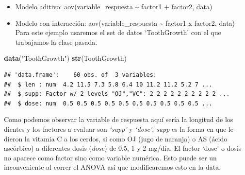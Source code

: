 \documentclass[
]{book}
\newenvironment{Shaded}{\begin{snugshade}}{\end{snugshade}}
\newcommand{\AttributeTok}[1]{\textcolor[rgb]{0.13,0.29,0.53}{#1}}
\newcommand{\DecValTok}[1]{\textcolor[rgb]{0.00,0.00,0.81}{#1}}
\newcommand{\FloatTok}[1]{\textcolor[rgb]{0.00,0.00,0.81}{#1}}
\newcommand{\FunctionTok}[1]{\textcolor[rgb]{0.13,0.29,0.53}{\textbf{#1}}}
\newcommand{\NormalTok}[1]{#1}
\newcommand{\OtherTok}[1]{\textcolor[rgb]{0.56,0.35,0.01}{#1}}
\newcommand{\SpecialCharTok}[1]{\textcolor[rgb]{0.81,0.36,0.00}{\textbf{#1}}}
\newcommand{\StringTok}[1]{\textcolor[rgb]{0.31,0.60,0.02}{#1}}
\begin{document}
\begin{itemize}
\item
  Modelo aditivo: aov(variable\_respuesta \textasciitilde{} factor1 + factor2, data)
\item
  Modelo con interacción: aov(variable\_respuesta \textasciitilde{} factor1 x factor2, data)\\
  Para este ejemplo usaremos el set de datos `ToothGrowth' con el que trabajamos la clase pasada.\\
\end{itemize}

\begin{Shaded}
\begin{Highlighting}[]
\FunctionTok{data}\NormalTok{(}\StringTok{"ToothGrowth"}\NormalTok{)}
\FunctionTok{str}\NormalTok{(ToothGrowth)}
\end{Highlighting}
\end{Shaded}

\begin{verbatim}
## 'data.frame':    60 obs. of  3 variables:
##  $ len : num  4.2 11.5 7.3 5.8 6.4 10 11.2 11.2 5.2 7 ...
##  $ supp: Factor w/ 2 levels "OJ","VC": 2 2 2 2 2 2 2 2 2 2 ...
##  $ dose: num  0.5 0.5 0.5 0.5 0.5 0.5 0.5 0.5 0.5 0.5 ...
\end{verbatim}

\hfill\break
Como podemos observar la variable de respuesta aquí sería la longitud de los dientes y los factores a evaluar son \emph{`supp'} y \emph{`dose'}, \emph{supp} es la forma en que le dieron la vitamia C a los cerdos, si como OJ (jugo de naranja) o AS (ácido ascórbico) a diferentes dosis (\emph{dose}) de 0.5, 1 y 2 mg/día.
El factor `dose' o dosis no aparece como factor sino como variable numérica.
Esto puede ser un inconveniente al correr el ANOVA así que modificaremos esto en la data.\\

\begin{Shaded}
\end{Shaded}
\end{document}
